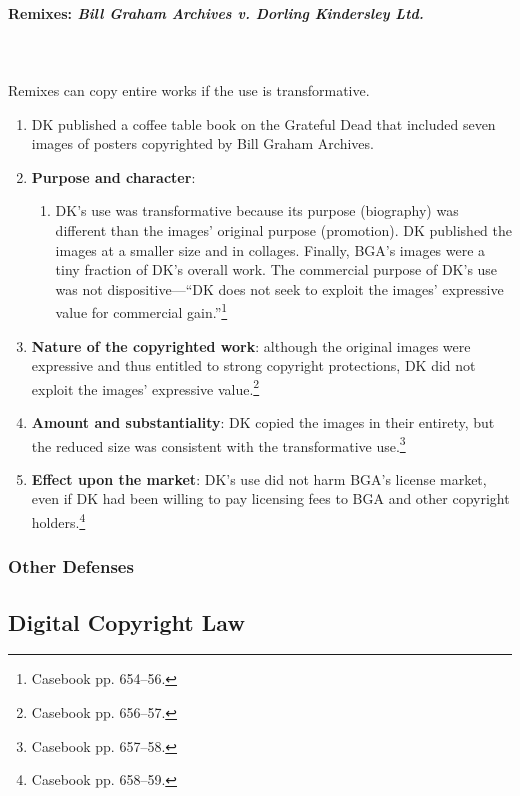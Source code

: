 \paragraph{Remixes: \emph{Bill Graham Archives v. Dorling Kindersley Ltd.}}
~\\\\
Remixes can copy entire works if the use is transformative.

\begin{enumerate}
    \item DK published a coffee table book on the Grateful Dead that included 
    seven images of posters copyrighted by Bill Graham Archives.
    \item \textbf{Purpose and character}:
    \begin{enumerate}
        \item DK's use was transformative because its purpose (biography) was 
        different than the images' original purpose (promotion). DK published 
        the images at a smaller size and in collages. Finally, BGA's images 
        were a tiny fraction of DK's overall work. The commercial purpose of 
        DK's use was not dispositive---``DK does not seek to exploit the 
        images' expressive value for commercial gain.''\footnote{Casebook pp. 
        654--56.}
    \end{enumerate}
    \item \textbf{Nature of the copyrighted work}: although the original 
    images were expressive and thus entitled to strong copyright protections, 
    DK did not exploit the images' expressive value.\footnote{Casebook pp. 
    656--57.}
    \item \textbf{Amount and substantiality}: DK copied the images in their 
    entirety, but the reduced size was consistent with the transformative 
    use.\footnote{Casebook pp. 657--58.}
    \item \textbf{Effect upon the market}: DK's use did not harm BGA's license 
    market, even if DK had been willing to pay licensing fees to BGA and other 
    copyright holders.\footnote{Casebook pp. 658--59.}
\end{enumerate}
\newpage %

\subsubsection{Other Defenses}


\subsection{Digital Copyright Law}

